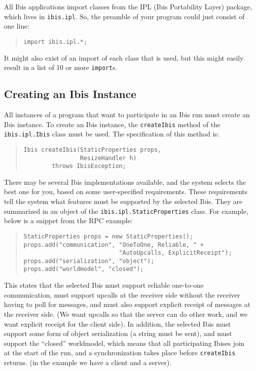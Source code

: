 \documentclass[10pt]{article}
\newcommand{\mysubsection}[1]{\subsection{#1}\label{#1}}
\begin{document}
All Ibis applications import classes from the IPL (Ibis
Portability Layer) package, which lives in
\verb+ibis.ipl+.
So, the preamble of your program could just consist of one line:
\begin{quote}
\begin{verbatim}
import ibis.ipl.*;
\end{verbatim}
\end{quote}
It might also exist of an import of each class that is used,
but this might easily result in a list of 10 or more \verb+import+s.

\mysubsection{Creating an Ibis Instance}

All instances of a program that want to participate in an Ibis run
must create an Ibis instance.
To create an Ibis instance, the \verb+createIbis+ method of the
\verb+ibis.ipl.Ibis+ class must be used.
The specification of this method is:
\begin{quote}
\begin{verbatim}
Ibis createIbis(StaticProperties props,
                ResizeHandler h)
        throws IbisException;
\end{verbatim}
\end{quote}
There may be several Ibis implementations available, and
the system selects the best one for you, based on some
user-specified requirements.
These requirements tell the system what features must be supported
by the selected Ibis.
They are summarized in an object of the
\verb+ibis.ipl.StaticProperties+ class.
For example, below is a snippet from the RPC example:
\begin{quote}
\begin{verbatim}
StaticProperties props = new StaticProperties();
props.add("communication", "OneToOne, Reliable, " + 
                           "AutoUpcalls, ExplicitReceipt");
props.add("serialization", "object");
props.add("worldmodel", "closed");
\end{verbatim}
\end{quote}
This states that the selected Ibis must support reliable one-to-one
communication, must support upcalls at the receiver side without the
receiver having to poll for messages, and must also support explicit
receipt of messages at the receiver side.
(We want upcalls so that the server can do other work, and we want
explicit receipt for the client side).
In addition, the selected Ibis must support some form of object
serialization (a string must be sent),
and must support the ``closed'' worldmodel, which means
that all participating Ibises join at the start of the run, and a
synchronization takes place before \verb+createIbis+ returns.
(in the example we have a client and a server).
\end{document}
